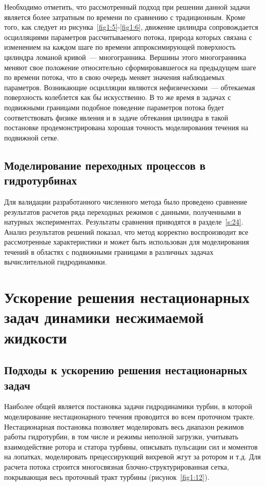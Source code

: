 Необходимо отметить, что рассмотренный подход  при решении данной задачи является более затратным по времени 
по сравнению с традиционным. Кроме того, как следует из рисунка~\ref{fig1:5}-\ref{fig1:6}, движение цилиндра 
сопровождается осцилляциями параметров рассчитываемого потока, природа которых связана с изменением на каждом 
шаге по времени аппроксимирующей поверхность цилиндра ломаной кривой~--- многогранника. Вершины этого 
многогранника меняют свое положение относительно сформировавшегося на предыдущем шаге по времени потока, что 
в свою очередь меняет значения наблюдаемых параметров. Возникающие осцилляции являются нефизическими~---  
обтекаемая поверхность колеблется как бы искусственно. В то же время в задачах с  подвижными границами 
подобное поведение параметров потока будет соответствовать физике явления и в задаче обтекания цилиндра в 
такой постановке продемонстрирована хорошая точность моделирования течения на подвижной сетке.


\subsection{Моделирование переходных процессов в гидротурбинах}
\label{s:153}
Для валидации разработанного численного метода было проведено сравнение результатов расчетов ряда 
переходных режимов с данными, полученными в натурных экспериментах. Результаты сравнения приводятся в 
разделе~\ref{s:24}. Анализ результатов решений показал, что метод корректно 
воспроизводит все рассмотренные характеристики и может быть использован для моделирования течений
в областях с подвижными границами в различных задачах вычислительной гидродинамики.

\section{Ускорение решения нестационарных задач динамики несжимаемой жидкости}
\label{s:16}
\subsection{Подходы к ускорению решения нестационарных задач}
\label{s:161}
Наиболее общей является постановка задачи гидродинамики турбин, в которой моделирование 
нестационарного течения проводится во всем проточном тракте. Нестационарная постановка позволяет моделировать 
весь диапазон режимов работы гидротурбин, в том числе и режимы неполной загрузки, учитывать взаимодействие 
ротора и статора турбины, описывать пульсации сил и моментов на лопатках, моделировать прецессирующий 
вихревой жгут за ротором и т.д. Для расчета потока строится многосвязная блочно-структурированная сетка, 
покрывающая весь проточный тракт турбины (рисунок~\ref{fig1:12}).  

